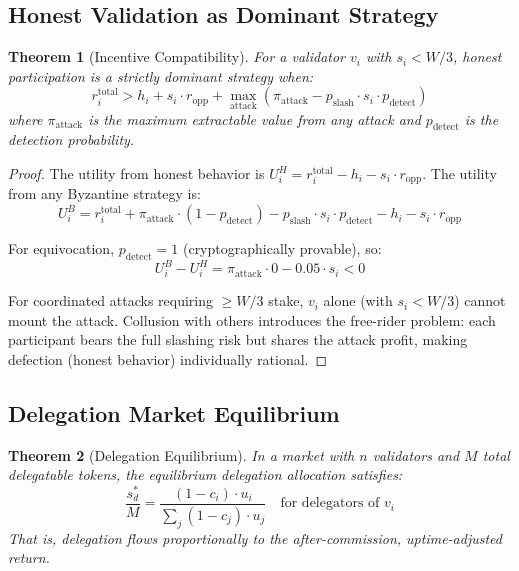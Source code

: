 \documentclass[11pt,a4paper]{article}
\newtheorem{theorem}{Theorem}
\begin{document}
\subsection{Honest Validation as Dominant Strategy}

\begin{theorem}[Incentive Compatibility]\label{thm:ic}
For a validator $v_i$ with $s_i < W/3$, honest participation is a strictly dominant strategy when:
\begin{equation}
    r_i^{\text{total}} > h_i + s_i \cdot r_{\text{opp}} + \max_{\text{attack}} \left(\pi_{\text{attack}} - p_{\text{slash}} \cdot s_i \cdot p_{\text{detect}}\right)
\end{equation}
where $\pi_{\text{attack}}$ is the maximum extractable value from any attack and $p_{\text{detect}}$ is the detection probability.
\end{theorem}

\begin{proof}
The utility from honest behavior is $U^H_i = r_i^{\text{total}} - h_i - s_i \cdot r_{\text{opp}}$. The utility from any Byzantine strategy is:
\begin{equation}
    U^B_i = r_i^{\text{total}} + \pi_{\text{attack}} \cdot (1 - p_{\text{detect}}) - p_{\text{slash}} \cdot s_i \cdot p_{\text{detect}} - h_i - s_i \cdot r_{\text{opp}}
\end{equation}

For equivocation, $p_{\text{detect}} = 1$ (cryptographically provable), so:
\begin{equation}
    U^B_i - U^H_i = \pi_{\text{attack}} \cdot 0 - 0.05 \cdot s_i < 0
\end{equation}

For coordinated attacks requiring $\geq W/3$ stake, $v_i$ alone (with $s_i < W/3$) cannot mount the attack. Collusion with others introduces the free-rider problem: each participant bears the full slashing risk but shares the attack profit, making defection (honest behavior) individually rational.
\end{proof}

\subsection{Delegation Market Equilibrium}

\begin{theorem}[Delegation Equilibrium]
In a market with $n$ validators and $M$ total delegatable tokens, the equilibrium delegation allocation satisfies:
\begin{equation}
    \frac{s_d^*}{M} = \frac{(1 - c_i) \cdot u_i}{\sum_j (1 - c_j) \cdot u_j} \quad \text{for delegators of } v_i
\end{equation}
That is, delegation flows proportionally to the after-commission, uptime-adjusted return.
\end{theorem}
\end{document}
